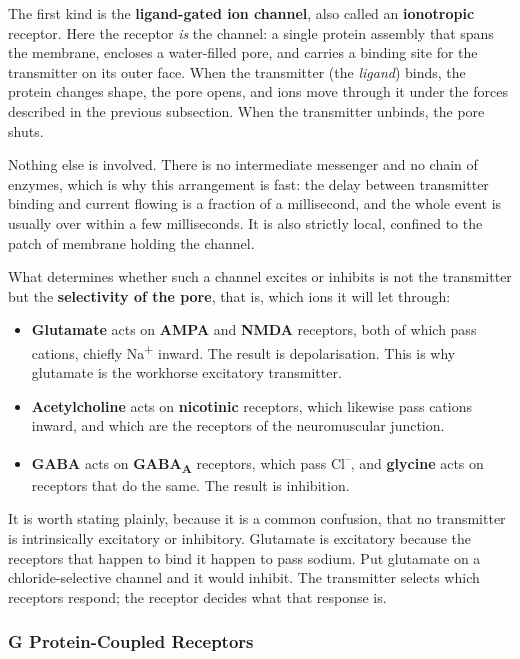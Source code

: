 \documentclass[11pt]{article}
\begin{document}
The first kind is the \textbf{ligand-gated ion channel}, also called an \textbf{ionotropic} receptor. Here the receptor \textit{is} the channel: a single protein assembly that spans the membrane, encloses a water-filled pore, and carries a binding site for the transmitter on its outer face. When the transmitter (the \textit{ligand}) binds, the protein changes shape, the pore opens, and ions move through it under the forces described in the previous subsection. When the transmitter unbinds, the pore shuts.

Nothing else is involved. There is no intermediate messenger and no chain of enzymes, which is why this arrangement is fast: the delay between transmitter binding and current flowing is a fraction of a millisecond, and the whole event is usually over within a few milliseconds. It is also strictly local, confined to the patch of membrane holding the channel.

What determines whether such a channel excites or inhibits is not the transmitter but the \textbf{selectivity of the pore}, that is, which ions it will let through:

\begin{itemize}
    \item \textbf{Glutamate} acts on \textbf{AMPA} and \textbf{NMDA} receptors, both of which pass cations, chiefly Na\textsuperscript{+} inward. The result is depolarisation. This is why glutamate is the workhorse excitatory transmitter.
    \item \textbf{Acetylcholine} acts on \textbf{nicotinic} receptors, which likewise pass cations inward, and which are the receptors of the neuromuscular junction.
    \item \textbf{GABA} acts on \textbf{GABA\textsubscript{A}} receptors, which pass Cl\textsuperscript{--}, and \textbf{glycine} acts on receptors that do the same. The result is inhibition.
\end{itemize}

It is worth stating plainly, because it is a common confusion, that no transmitter is intrinsically excitatory or inhibitory. Glutamate is excitatory because the receptors that happen to bind it happen to pass sodium. Put glutamate on a chloride-selective channel and it would inhibit. The transmitter selects which receptors respond; the receptor decides what that response is.

\subsubsection{G Protein-Coupled Receptors}
\end{document}
